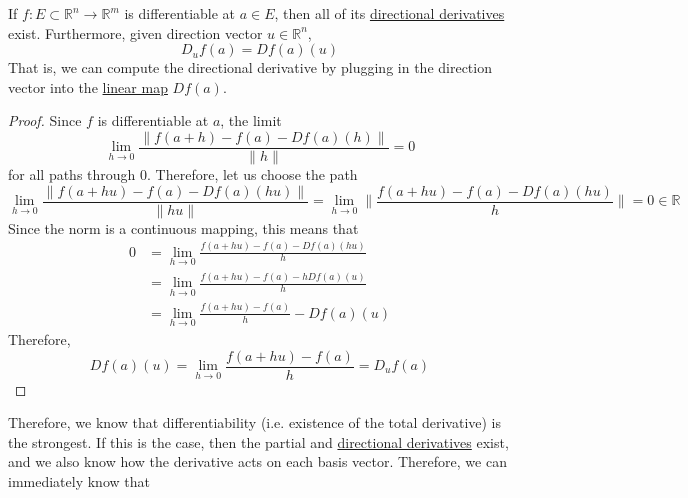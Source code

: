   \begin{theorem}
    \label{thm:differentiability-implies-existence-of-all}
 
		If $f: E \subset \mathbb{R}^n \to \mathbb{R}^m$ is differentiable at $a \in E$, then all of its \hyperref[def:directional-derivative]{directional derivatives} exist. Furthermore, given direction vector $u \in \mathbb{R}^n$, 
		\begin{equation}
		  D_u f(a) = Df(a) (u)
		\end{equation}
		That is, we can compute the directional derivative by plugging in the direction vector into the \hyperref[lin-def:linear_map]{linear map} $Df(a)$.  
  \end{theorem} 
	\begin{proof}
		Since $f$ is differentiable at $a$, the limit 
		\begin{equation}
			\lim_{h \to 0} \frac{\|f(a + h) - f(a) - Df(a) (h)\|}{\|h\|} = 0 
		\end{equation}
		for all paths through $0$. Therefore, let us choose the path 
		\begin{equation}
			\lim_{h \to 0} \frac{\|f(a + hu) - f(a) - Df(a) (hu)\|}{\|hu\|} = \lim_{h \to 0} \bigg\| \frac{f(a + hu) - f(a) - Df(a) (hu)}{h} \bigg\| = 0 \in \mathbb{R}
		\end{equation}
		Since the norm is a continuous mapping, this means that 
		\begin{align}
			0 & = \lim_{h \to 0} \frac{f(a + hu) - f(a) - Df(a) (hu)}{h} \\ 
				& = \lim_{h \to 0} \frac{f(a + hu) - f(a) - h Df(a) (u)}{h} \\
				& = \lim_{h \to 0} \frac{f(a + hu) - f(a)}{h} - Df(a) (u)
		\end{align} 
		Therefore, 
		\begin{equation}
			Df(a) (u) = \lim_{h \to 0} \frac{f(a + hu) - f(a)}{h} = D_u f(a)
		\end{equation}
	\end{proof}

  Therefore, we know that differentiability (i.e. existence of the total derivative) is the strongest. If this is the case, then the partial and \hyperref[def:directional-derivative]{directional derivatives} exist, and we also know how the derivative acts on each basis vector. Therefore, we can immediately know that 

